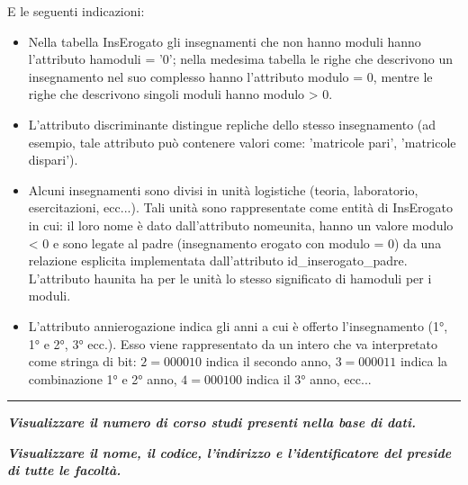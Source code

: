 \documentclass[a4paper]{article}
\newcommand{\longline}{\noindent\rule{\textwidth}{0.4pt}}
\begin{document}
	\noindent
	E le seguenti indicazioni:
	\begin{itemize}
		\item Nella tabella \textsf{InsErogato} gli insegnamenti che non hanno moduli hanno l'attributo \textsf{hamoduli = '0'}; nella medesima tabella le righe che descrivono un insegnamento nel suo complesso hanno l'attributo \textsf{modulo = 0}, mentre le righe che descrivono singoli moduli hanno \textsf{modulo > 0}.
		
		\item L'attributo \textsf{discriminante} distingue repliche dello stesso insegnamento (ad esempio, tale attributo può contenere valori come: 'matricole pari', 'matricole dispari').
		
		\item Alcuni insegnamenti sono divisi in unità logistiche (teoria, laboratorio, esercitazioni, ecc...). Tali unità sono rappresentate come entità di InsErogato in cui: il loro nome è dato dall'attributo \textsf{nomeunita}, hanno un valore \textsf{modulo < 0} e sono legate al padre (insegnamento erogato con \textsf{modulo = 0}) da una relazione esplicita implementata dall'attributo \textsf{id\_inserogato\_padre}. L'attributo \textsf{haunita} ha per le unità lo stesso significato di \textsf{hamoduli} per i moduli.
		
		\item L'attributo \textsf{annierogazione} indica gli anni a cui è offerto l'insegnamento (1°, 1° e 2°, 3° ecc.). Esso viene rappresentato da un intero che va interpretato come stringa di bit: $2=000010$ indica il secondo anno, $3=000011$ indica la combinazione 1° e 2° anno, $4=000100$ indica il 3° anno, ecc...
	\end{itemize}

	\longline\:\newline

	\noindent
	\textcolor{Green4}{\textbf{\emph{Visualizzare il numero di corso studi presenti nella base di dati.}}}\newline
	
	\noindent
	\:\newline

	\noindent
	\textcolor{Green4}{\textbf{\emph{Visualizzare il nome, il codice, l'indirizzo e l'identificatore del preside di tutte le facoltà.}}}\newline
	
	\noindent
	\newpage
\end{document}
